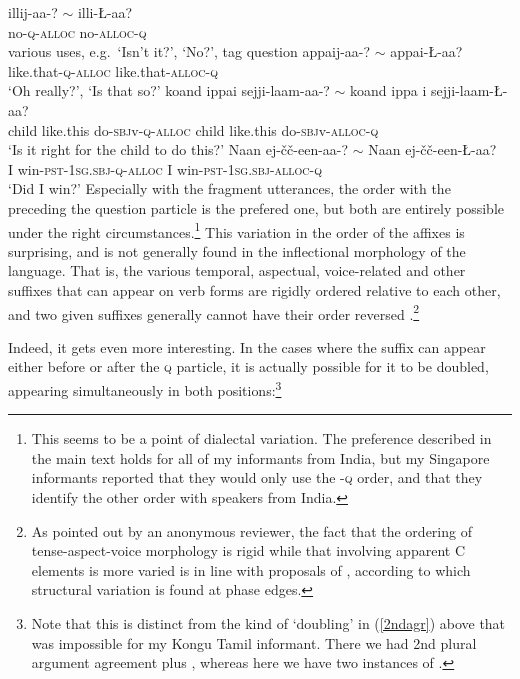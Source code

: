 \documentclass[output=paper, modfonts, nonflat]{langsci/langscibook}
\begin{document}
\ea
 \ea\label{illiya}\gll illij-aa-\nga? $\sim$ illi-\nga\L-aa?\\
 no-\textsc{q}-\textsc{alloc}{} {} no-\textsc{alloc}-\textsc{q}\\
 \glt various uses, e.g.\ `Isn't it?', `No?', tag question
 \ex\label{apdiya}\gll appa\D ij-aa-\nga? $\sim$ appa\D i-\nga\L-aa?\\
 like.that-\textsc{q}-\textsc{alloc}{} {} like.that-\textsc{alloc}-\textsc{q}\\
 \glt `Oh really?', `Is that so?' 
 \ex\label{child}\gll ko\Z and\E{} ippa\D i sejji-laam-aa-\nga? $\sim$
 ko\Z and\E{} ippa\D 
 i sejji-laam-\nga\L-aa?\\ 
 child like.this do-\textsc{sbj}v-\textsc{q}-\textsc{alloc}{} {} child like.this
 do-\textsc{sbj}v-\textsc{alloc}-\textsc{q}\\ 
 \glt `Is it right for the child to do this?'
 \ex\label{winning}\gll Naan \J ej-\v{c}\v{c}-een-aa-\nga? $\sim$ Naan \J
 ej-\v{c}\v{c}-een-\nga\L-aa?\\
 I win-\textsc{pst}-1\textsc{sg}.\textsc{sbj}-\textsc{q}-\textsc{alloc}{} {} I win-\textsc{pst}-1\textsc{sg}.\textsc{sbj}-\textsc{alloc}-\textsc{q}\\
 \glt `Did I win?'
 \z
\z
%
Especially with the fragment utterances, the order with the \allagr{}
preceding the question particle is the prefered one, but both are
entirely possible under the right circumstances.\footnote{This seems
  to be a point of dialectal variation. The preference described in
  the main text holds for all of my informants from India, but my
  Singapore informants reported that they would only use the
  \allagr-\textsc{q} order, and that they identify the other order
  with speakers from India.} This variation in the order of the
affixes is surprising, and is not generally found in the inflectional
morphology of the language. That is, the various temporal, aspectual,
voice-related and other suffixes that can appear on verb forms are
rigidly ordered relative to each other, and two given suffixes
generally cannot have their order reversed \citep[for extended
discussion on this point,
see][]{sundaresanmcfadden:tamtrans}.\footnote{As pointed out by an
  anonymous reviewer, the fact that the ordering of tense-aspect-voice
  morphology is rigid while that involving apparent C elements is more
  varied is in line with proposals of \citet{aboh:2015}, according to
  which structural variation is found at phase edges.}

Indeed, it gets even more interesting. In the cases where the
\allagr{} suffix can appear either before or after the \textsc{q}
particle, it is actually possible for it to be doubled, appearing
simultaneously in both positions:\footnote{Note that this is distinct
  from the kind of `doubling' in (\ref{2ndagr}) above that was
  impossible for my Kongu Tamil informant. There we had 2nd plural
  argument agreement plus \allagr, whereas here we have two instances
  of \allagr.}
\end{document}
